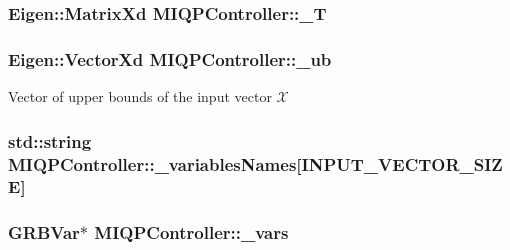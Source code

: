 \hypertarget{classMIQPController_a1143455ae85d0e221578dbe5d659af1d}{
\subsubsection[{\-\_\-\-T}]{\setlength{\rightskip}{0pt plus 5cm}\-Eigen\-::\-Matrix\-Xd {\bf \-M\-I\-Q\-P\-Controller\-::\-\_\-\-T}}}\label{classMIQPController_a1143455ae85d0e221578dbe5d659af1d}
\hypertarget{classMIQPController_aa8407451ad8b20c814b12fef631f43f6}{
\subsubsection[{\-\_\-ub}]{\setlength{\rightskip}{0pt plus 5cm}\-Eigen\-::\-Vector\-Xd {\bf \-M\-I\-Q\-P\-Controller\-::\-\_\-ub}}}\label{classMIQPController_aa8407451ad8b20c814b12fef631f43f6}
\-Vector of upper bounds of the input vector $\mathcal{X}$ \hypertarget{classMIQPController_a2c3ddd93fd843a3a4650314b47436be7}{
\subsubsection[{\-\_\-variables\-Names}]{\setlength{\rightskip}{0pt plus 5cm}std\-::string {\bf \-M\-I\-Q\-P\-Controller\-::\-\_\-variables\-Names}\mbox{[}{\bf \-I\-N\-P\-U\-T\-\_\-\-V\-E\-C\-T\-O\-R\-\_\-\-S\-I\-Z\-E}\mbox{]}}}\label{classMIQPController_a2c3ddd93fd843a3a4650314b47436be7}
\hypertarget{classMIQPController_a1143bf95d61a348b08010c909b190029}{
\subsubsection[{\-\_\-vars}]{\setlength{\rightskip}{0pt plus 5cm}\-G\-R\-B\-Var$\ast$ {\bf \-M\-I\-Q\-P\-Controller\-::\-\_\-vars}}}\label{classMIQPController_a1143bf95d61a348b08010c909b190029}

